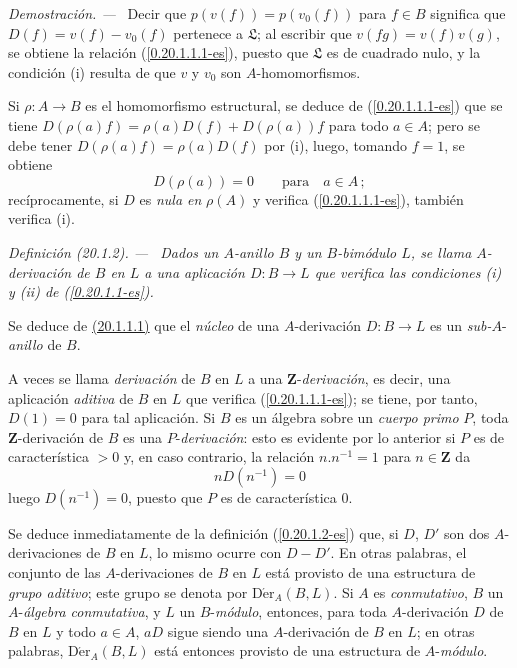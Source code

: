 \documentclass[10pt,oneside]{book}
\makeatletter
\newcommand{\sref}[1]{\textup{(\ref{#1})}}
\newcommand{\setmanualcurrentlabel}[1]{\def\@currentlabel{#1}}
\newenvironment{definition}[1][]{%
  \setmanualcurrentlabel{#1}\par\medskip\noindent\itshape Definición (#1). ---\ }{\par}
\newenvironment{proof}{%
  \par\medskip\noindent\textit{Demostración. ---\ }}{\par}
\providecommand{\setmin}{-}%
\makeatother
\begin{document}
\begin{proof}
Decir que $p(v(f))=p(v_0(f))$ para $f\in B$ significa que
$D(f)=v(f)\setmin v_0(f)$ pertenece a $\mathfrak L$; al escribir que
$v(fg)=v(f)v(g)$, se obtiene la relación \sref{0.20.1.1.1-es},
puesto que $\mathfrak L$ es de cuadrado nulo, y la condición (i) resulta de que
$v$ y $v_0$ son $A$-homomorfismos.

Si $\rho:A\to B$ es el homomorfismo estructural, se deduce de
\sref{0.20.1.1.1-es} que se tiene
$D(\rho(a)f)=\rho(a)D(f)+D(\rho(a))f$ para todo $a\in A$; pero se debe
tener $D(\rho(a)f)=\rho(a)D(f)$ por (i), luego, tomando $f=1$, se
obtiene
\[
  D(\rho(a))=0 \qquad\text{para}\quad a\in A\,;
\]
recíprocamente, si $D$ es \emph{nula en} $\rho(A)$ y verifica
\sref{0.20.1.1.1-es}, también verifica (i).
\end{proof}

\begin{definition}[20.1.2]
\label{0.20.1.2-es}
Dados un $A$-anillo $B$ y un $B$-bimódulo $L$, se llama
$A$-derivación de $B$ en $L$ a una aplicación $D:B\to L$ que verifica
las condiciones \textup{(i)} y \textup{(ii)} de \sref{0.20.1.1-es}.
\end{definition}

Se deduce de \hyperref[0.20.1.1-es]{\textup{(20.1.1.1)}} que el \emph{núcleo} de una $A$-derivación
$D:B\to L$ es un \emph{sub-}$A$-\emph{anillo} de $B$.

A veces se llama \emph{derivación} de $B$ en $L$ a una
$\mathbf{Z}$-\emph{derivación}, es decir, una aplicación \emph{aditiva} de $B$
en $L$ que verifica \sref{0.20.1.1.1-es}; se tiene, por tanto, $D(1)=0$ para tal
aplicación. Si $B$ es un álgebra sobre un \emph{cuerpo primo} $P$, toda
$\mathbf{Z}$-derivación de $B$ es una $P$-\emph{derivación}: esto es evidente por lo
anterior si $P$ es de característica $>0$ y, en caso contrario,
la relación $n.n^{-1}=1$ para $n\in\mathbf{Z}$ da
\[
  nD(n^{-1})=0
\]
luego $D(n^{-1})=0$, puesto que $P$ es de característica $0$.

Se deduce inmediatamente de la definición \sref{0.20.1.2-es} que, si $D$, $D'$
son dos $A$-derivaciones de $B$ en $L$, lo mismo ocurre con $D\setmin D'$. En otras
palabras, el conjunto de las $A$-derivaciones de $B$ en $L$ está provisto de una
estructura de \emph{grupo aditivo}; este grupo se denota por
$\operatorname{D\acute{e}r}_A(B,L)$. Si $A$ es \emph{conmutativo}, $B$ un
$A$-\emph{álgebra conmutativa}, y $L$ un $B$-\emph{módulo}, entonces, para toda
$A$-derivación $D$ de $B$ en $L$ y todo $a\in A$, $aD$ sigue siendo una
$A$-derivación de $B$ en $L$; en otras palabras, $\operatorname{D\acute{e}r}_A(B,L)$
está entonces provisto de una estructura de $A$-\emph{módulo}.
\end{document}
